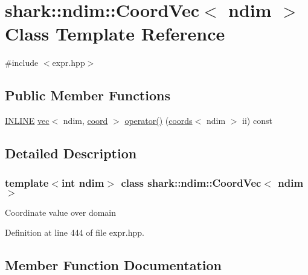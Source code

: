 \hypertarget{classshark_1_1ndim_1_1_coord_vec}{}\section{shark\+:\+:ndim\+:\+:Coord\+Vec$<$ ndim $>$ Class Template Reference}
\label{classshark_1_1ndim_1_1_coord_vec}


{\ttfamily \#include $<$expr.\+hpp$>$}

\subsection*{Public Member Functions}
\begin{DoxyCompactItemize}
\item 
\hyperlink{common_8hpp_a2eb6f9e0395b47b8d5e3eeae4fe0c116}{I\+N\+L\+I\+NE} \hyperlink{structshark_1_1ndim_1_1vec}{vec}$<$ ndim, \hyperlink{namespaceshark_a767a92d5dd82cb82266473bff42fa6d9}{coord} $>$ \hyperlink{classshark_1_1ndim_1_1_coord_vec_ab0a4c8fc496096cace711c96b56ec962}{operator()} (\hyperlink{structshark_1_1ndim_1_1coords}{coords}$<$ ndim $>$ ii) const
\end{DoxyCompactItemize}


\subsection{Detailed Description}
\subsubsection*{template$<$int ndim$>$\newline
class shark\+::ndim\+::\+Coord\+Vec$<$ ndim $>$}

Coordinate value over domain 

Definition at line 444 of file expr.\+hpp.



\subsection{Member Function Documentation}
\hypertarget{classshark_1_1ndim_1_1_coord_vec_ab0a4c8fc496096cace711c96b56ec962}{}\label{classshark_1_1ndim_1_1_coord_vec_ab0a4c8fc496096cace711c96b56ec962} 
